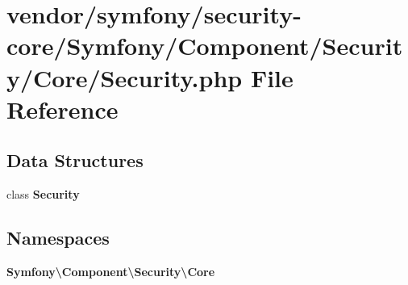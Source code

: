 \section{vendor/symfony/security-\/core/\+Symfony/\+Component/\+Security/\+Core/\+Security.php File Reference}
\label{_security_8php}
\subsection*{Data Structures}
\begin{DoxyCompactItemize}
\item 
class {\bf Security}
\end{DoxyCompactItemize}
\subsection*{Namespaces}
\begin{DoxyCompactItemize}
\item 
 {\bf Symfony\textbackslash{}\+Component\textbackslash{}\+Security\textbackslash{}\+Core}
\end{DoxyCompactItemize}
